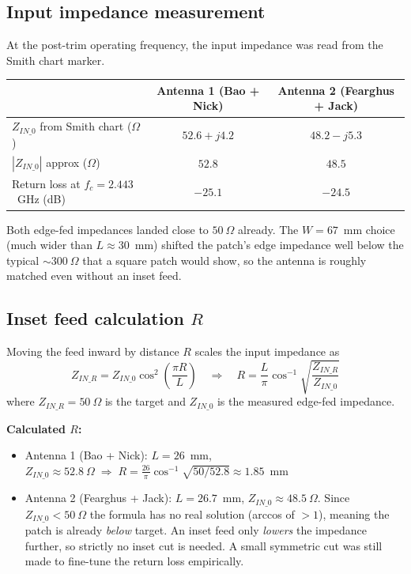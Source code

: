 \documentclass[11pt,letterpaper]{article}
\begin{document}
\subsection*{Input impedance measurement}

At the post-trim operating frequency, the input impedance was read from the Smith chart marker.

\begin{center}
\begin{tabular}{lcc}
\toprule
 & Antenna 1 (Bao + Nick) & Antenna 2 (Fearghus + Jack) \\
\midrule
$Z_{IN\_0}$ from Smith chart ($\Omega$) & $52.6 + j4.2$ & $48.2 - j5.3$ \\
$|Z_{IN\_0}|$ approx ($\Omega$)          & $52.8$        & $48.5$        \\
Return loss at $f_c = 2.443$~GHz (dB)    & $-25.1$       & $-24.5$       \\
\bottomrule
\end{tabular}
\end{center}

Both edge-fed impedances landed close to $50~\Omega$ already. The $W = 67$~mm choice (much wider than $L \approx 30$~mm) shifted the patch's edge impedance well below the typical $\sim 300~\Omega$ that a square patch would show, so the antenna is roughly matched even without an inset feed.

\subsection*{Inset feed calculation \texorpdfstring{$R$}{R}}

Moving the feed inward by distance $R$ scales the input impedance as
\[
Z_{IN\_R} = Z_{IN\_0}\cos^2\!\left(\frac{\pi R}{L}\right) \quad\Longrightarrow\quad R = \frac{L}{\pi}\cos^{-1}\!\sqrt{\frac{Z_{IN\_R}}{Z_{IN\_0}}}
\]
where $Z_{IN\_R} = 50~\Omega$ is the target and $Z_{IN\_0}$ is the measured edge-fed impedance.

\textbf{Calculated $R$:}
\begin{itemize}[leftmargin=*]
  \item Antenna 1 (Bao + Nick): $L = 26$~mm, $Z_{IN\_0} \approx 52.8~\Omega \;\Rightarrow\; R = \tfrac{26}{\pi}\cos^{-1}\!\sqrt{50/52.8} \approx 1.85$~mm
  \item Antenna 2 (Fearghus + Jack): $L = 26.7$~mm, $Z_{IN\_0} \approx 48.5~\Omega$. Since $Z_{IN\_0} < 50~\Omega$ the formula has no real solution (arccos of $>1$), meaning the patch is already \emph{below} target. An inset feed only \emph{lowers} the impedance further, so strictly no inset cut is needed. A small symmetric cut was still made to fine-tune the return loss empirically.
\end{itemize}
\end{document}
